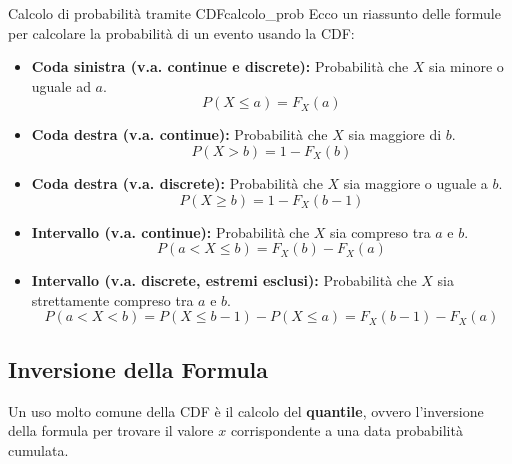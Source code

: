 \begin{nota}{Calcolo di probabilità tramite CDF}{calcolo_prob}
Ecco un riassunto delle formule per calcolare la probabilità di un evento usando la CDF:
\begin{itemize}
    \item \textbf{Coda sinistra (v.a. continue e discrete):} Probabilità che \( X \) sia minore o uguale ad \( a \).
    \[ P(X \le a) = F_X(a) \]
    \item \textbf{Coda destra (v.a. continue):} Probabilità che \( X \) sia maggiore di \( b \).
    \[ P(X > b) = 1 - F_X(b) \]
    \item \textbf{Coda destra (v.a. discrete):} Probabilità che \( X \) sia maggiore o uguale a \( b \).
    \[ P(X \ge b) = 1 - F_X(b-1) \]
    \item \textbf{Intervallo (v.a. continue):} Probabilità che \( X \) sia compreso tra \( a \) e \( b \).
    \[ P(a < X \le b) = F_X(b) - F_X(a) \]
    \item \textbf{Intervallo (v.a. discrete, estremi esclusi):} Probabilità che \( X \) sia strettamente compreso tra \( a \) e \( b \).
    \[ P(a < X < b) = P(X \le b-1) - P(X \le a) = F_X(b-1) - F_X(a) \]
\end{itemize}
\end{nota}

\subsection{Inversione della Formula}\label{ssec:inversione}

Un uso molto comune della CDF è il calcolo del \textbf{quantile}, ovvero l'inversione della formula per trovare il valore \( x \) corrispondente a una data probabilità cumulata.

